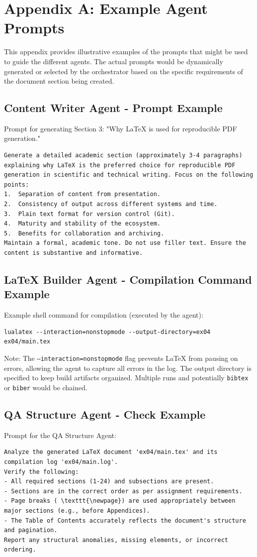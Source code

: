 \documentclass{custom-academic-template}
\begin{document}
\section{Appendix A: Example Agent Prompts}
This appendix provides illustrative examples of the prompts that might be used to guide the different agents. The actual prompts would be dynamically generated or selected by the orchestrator based on the specific requirements of the document section being created.

\subsection{Content Writer Agent - Prompt Example}
Prompt for generating Section 3: "Why LaTeX is used for reproducible PDF generation."
\begin{verbatim}
Generate a detailed academic section (approximately 3-4 paragraphs) explaining why LaTeX is the preferred choice for reproducible PDF generation in scientific and technical writing. Focus on the following points:
1.  Separation of content from presentation.
2.  Consistency of output across different systems and time.
3.  Plain text format for version control (Git).
4.  Maturity and stability of the ecosystem.
5.  Benefits for collaboration and archiving.
Maintain a formal, academic tone. Do not use filler text. Ensure the content is substantive and informative.
\end{verbatim}

\subsection{LaTeX Builder Agent - Compilation Command Example}
Example shell command for compilation (executed by the agent):
\begin{verbatim}
lualatex --interaction=nonstopmode --output-directory=ex04 ex04/main.tex
\end{verbatim}
Note: The 	\texttt{--interaction=nonstopmode} flag prevents LaTeX from pausing on errors, allowing the agent to capture all errors in the log. The output directory is specified to keep build artifacts organized. Multiple runs and potentially 	\texttt{bibtex} or 	\texttt{biber} would be chained.

\subsection{QA Structure Agent - Check Example}
Prompt for the QA Structure Agent:
\begin{verbatim}
Analyze the generated LaTeX document 'ex04/main.tex' and its compilation log 'ex04/main.log'.
Verify the following:
- All required sections (1-24) and subsections are present.
- Sections are in the correct order as per assignment requirements.
- Page breaks (	\texttt{\newpage}) are used appropriately between major sections (e.g., before Appendices).
- The Table of Contents accurately reflects the document's structure and pagination.
Report any structural anomalies, missing elements, or incorrect ordering.
\end{verbatim}
\end{document}
